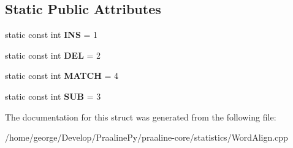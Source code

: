 \subsection*{Static Public Attributes}
\begin{DoxyCompactItemize}
\item 
\mbox{\label{struct_word_align_data_ab0f71f822fa66521846dc72bd519513a}} 
static const int {\bfseries I\+NS} = 1
\item 
\mbox{\label{struct_word_align_data_a0c16cd48d775536ce4758d60ce08d1f6}} 
static const int {\bfseries D\+EL} = 2
\item 
\mbox{\label{struct_word_align_data_a4a71b7dfef84b26b589f159b08965ee4}} 
static const int {\bfseries M\+A\+T\+CH} = 4
\item 
\mbox{\label{struct_word_align_data_aa4f54ad74a4cb034673d6aeac8231a07}} 
static const int {\bfseries S\+UB} = 3
\end{DoxyCompactItemize}


The documentation for this struct was generated from the following file\+:\begin{DoxyCompactItemize}
\item 
/home/george/\+Develop/\+Praaline\+Py/praaline-\/core/statistics/Word\+Align.\+cpp\end{DoxyCompactItemize}
